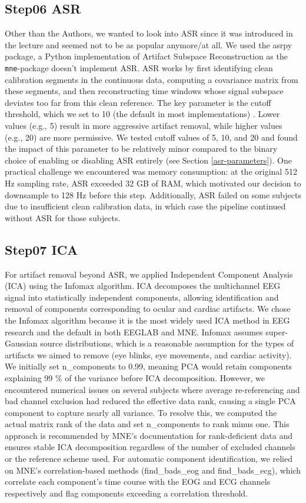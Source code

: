 \documentclass{scrartcl}
\begin{document}
\subsection{Step06 ASR}
Other than the Authors, we wanted to look into ASR since it was introduced in the lecture and seemed not to be as popular anymore/at all. We used the asrpy package, a Python implementation of Artifact Subspace Reconstruction as the \texttt{mne}-package doesn't implement ASR. ASR works by first identifying clean calibration segments in the continuous data, computing a covariance matrix from these segments, and then reconstructing time windows whose signal subspace deviates too far from this clean reference. The key parameter is the cutoff threshold, which we set to 10 (the default in most implementations) \cite{asr-parameters}. Lower values (e.g., 5) result in more aggressive artifact removal, while higher values (e.g., 20) are more permissive. We tested cutoff values of 5, 10, and 20 and found the impact of this parameter to be relatively minor compared to the binary choice of enabling or disabling ASR entirely (see Section \ref{asr-parameters}). One practical challenge we encountered was memory consumption: at the original 512 Hz sampling rate, ASR exceeded 32 GB of RAM, which motivated our decision to downsample to 128 Hz before this step. Additionally, ASR failed on some subjects due to insufficient clean calibration data, in which case the pipeline continued without ASR for those subjects.

\subsection{Step07 ICA}
For artifact removal beyond ASR, we applied Independent Component Analysis (ICA) using the Infomax algorithm. ICA decomposes the multichannel EEG signal into statistically independent components, allowing identification and removal of components corresponding to ocular and cardiac artifacts. We chose the Infomax algorithm because it is the most widely used ICA method in EEG research and the default in both EEGLAB and MNE. Infomax assumes super-Gaussian source distributions, which is a reasonable assumption for the types of artifacts we aimed to remove (eye blinks, eye movements, and cardiac activity). We initially set n\_components to 0.99, meaning PCA would retain components explaining 99 \% of the variance before ICA decomposition. However, we encountered numerical issues on several subjects where average re-referencing and bad channel exclusion had reduced the effective data rank, causing a single PCA component to capture nearly all variance. To resolve this, we computed the actual matrix rank of the data and set n\_components to rank minus one. This approach is recommended by MNE's documentation for rank-deficient data and ensures stable ICA decomposition regardless of the number of excluded channels or the reference scheme used. For automatic component identification, we relied on MNE's correlation-based methods (find\_bads\_eog and find\_bads\_ecg), which correlate each component's time course with the EOG and ECG channels respectively and flag components exceeding a correlation threshold.
\end{document}
